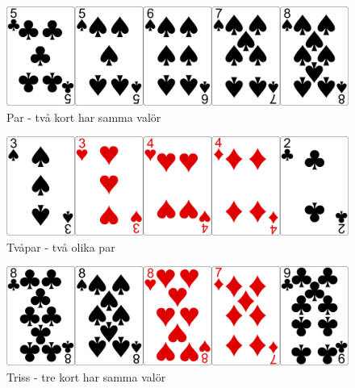 
\begin{figure}[h]
 \begin{minipage}[c]{0.5\textwidth}
  \includegraphics[width=\textwidth]{../img/w05-hands/pair.png}
 \end{minipage}
 \begin{minipage}[c]{0.3\textwidth}
  \caption{Par - två kort har samma valör}
 \end{minipage}
\end{figure}

\begin{figure}[h]
 \begin{minipage}[c]{0.5\textwidth}
  \includegraphics[width=\textwidth]{../img/w05-hands/twopair.png}
 \end{minipage}
 \begin{minipage}[c]{0.3\textwidth}
  \caption{Tvåpar - två olika par}
 \end{minipage}
\end{figure}

\begin{figure}[h]
 \begin{minipage}[c]{0.5\textwidth}
  \includegraphics[width=\textwidth]{../img/w05-hands/trips.png}
 \end{minipage}
 \begin{minipage}[c]{0.3\textwidth}
  \caption{Triss - tre kort har samma valör}
 \end{minipage}
\end{figure}

